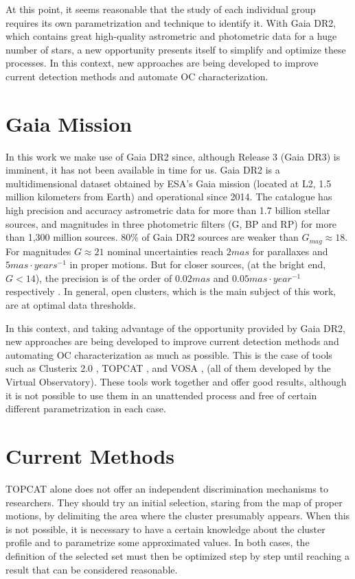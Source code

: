 \documentclass[11pt, a4paper, english]{book}
\begin{document}
At this point, it seems reasonable that the study of each individual group requires its own parametrization and technique
to identify it. With Gaia DR2, which contains great high-quality astrometric and photometric data for a huge number of stars,
a new opportunity presents itself to simplify and optimize these processes. In this context, new approaches are being developed
to improve current detection methods and automate OC characterization.

\section{Gaia Mission}

In this work we make use of Gaia DR2 since, although Release 3 (Gaia DR3) is imminent, it has not been available in time for us.
Gaia DR2 is a multidimensional dataset obtained by ESA's Gaia mission (located at L2, 1.5 million kilometers from Earth) and
operational since 2014. The catalogue has high precision and accuracy astrometric data for more than 1.7 billion stellar sources,
and magnitudes in three photometric filters (G, BP and RP) for more than 1,300 million sources.
80\% of Gaia DR2 sources are weaker than $G_{mag} \approx 18$. For magnitudes $G \approx 21$ nominal uncertainties reach
$2 mas$ for parallaxes and $5 mas \cdot years^{-1}$ in proper motions. But for closer sources, (at the bright end, $G < 14$),
the precision is of the order of $0.02 mas$ and $0.05 mas \cdot year^{-1}$ respectively \cite{cantat2018gaia}. In general,
open clusters, which is the main subject of this work, are at optimal data thresholds.

In this context, and taking advantage of the opportunity provided by Gaia DR2, new approaches are being developed to improve current
detection methods and automating OC characterization as much as possible. This is the case of tools such as Clusterix 2.0
\cite{balaguer2020clusterix}, TOPCAT \cite{taylor2005topcat}, and VOSA \cite{bayo2008vosa}, (all of them developed by the Virtual Observatory).
These tools work together and offer good results, although it is not possible to use them in an unattended process and free of certain
different parametrization in each case.

\section{Current Methods}

TOPCAT alone does not offer an independent discrimination mechanisms to researchers. They should try an initial selection, staring from the
map of proper motions, by delimiting the area where the cluster presumably appears. When this is not possible, it is necessary to have a
certain knowledge about the cluster profile and to parametrize some approximated values. In both cases, the definition of the selected
set must then be optimized step by step until reaching a result that can be considered reasonable.
\end{document}
